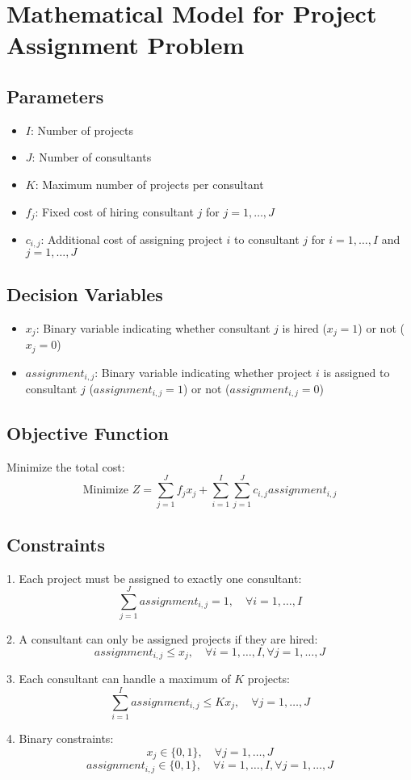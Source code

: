 \documentclass{article}
\begin{document}
\section*{Mathematical Model for Project Assignment Problem}

\subsection*{Parameters}
\begin{itemize}
    \item \( I \): Number of projects
    \item \( J \): Number of consultants
    \item \( K \): Maximum number of projects per consultant
    \item \( f_j \): Fixed cost of hiring consultant \( j \) for \( j = 1, \ldots, J \)
    \item \( c_{i,j} \): Additional cost of assigning project \( i \) to consultant \( j \) for \( i = 1, \ldots, I \) and \( j = 1, \ldots, J \)
\end{itemize}

\subsection*{Decision Variables}
\begin{itemize}
    \item \( x_{j} \): Binary variable indicating whether consultant \( j \) is hired (\( x_j = 1 \)) or not (\( x_j = 0 \))
    \item \( assignment_{i,j} \): Binary variable indicating whether project \( i \) is assigned to consultant \( j \) (\( assignment_{i,j} = 1 \)) or not (\( assignment_{i,j} = 0 \))
\end{itemize}

\subsection*{Objective Function}
Minimize the total cost:
\[
\text{Minimize } Z = \sum_{j=1}^{J} f_j x_j + \sum_{i=1}^{I} \sum_{j=1}^{J} c_{i,j} assignment_{i,j}
\]

\subsection*{Constraints}
1. Each project must be assigned to exactly one consultant:
\[
\sum_{j=1}^{J} assignment_{i,j} = 1, \quad \forall i = 1, \ldots, I
\]

2. A consultant can only be assigned projects if they are hired:
\[
assignment_{i,j} \leq x_j, \quad \forall i = 1, \ldots, I, \forall j = 1, \ldots, J
\]

3. Each consultant can handle a maximum of \( K \) projects:
\[
\sum_{i=1}^{I} assignment_{i,j} \leq K x_j, \quad \forall j = 1, \ldots, J
\]

4. Binary constraints:
\[
x_j \in \{0, 1\}, \quad \forall j = 1, \ldots, J
\]
\[
assignment_{i,j} \in \{0, 1\}, \quad \forall i = 1, \ldots, I, \forall j = 1, \ldots, J
\]
\end{document}
